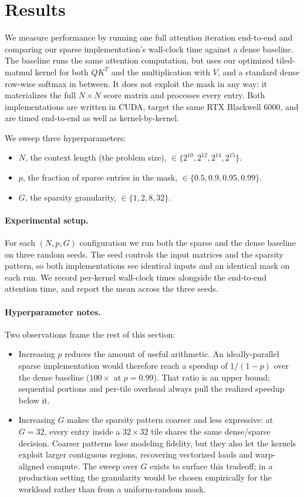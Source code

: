 \documentclass[11pt]{article}
\begin{document}
\section*{Results}
We measure performance by running one full attention iteration end-to-end and comparing our sparse implementation's wall-clock time against a dense baseline. The baseline runs the same attention computation, but uses our optimized tiled-matmul kernel for both $QK^T$ and the multiplication with $V$, and a standard dense row-wise softmax in between. It does not exploit the mask in any way: it materializes the full $N \times N$ score matrix and processes every entry. Both implementations are written in CUDA, target the same RTX Blackwell 6000, and are timed end-to-end as well as kernel-by-kernel.

We sweep three hyperparameters:
\begin{itemize}
    \item $N$, the context length (the problem size), $\in \{2^{10}, 2^{12}, 2^{14}, 2^{15}\}$.
    \item $p$, the fraction of sparse entries in the mask, $\in \{0.5, 0.9, 0.95, 0.99\}$.
    \item $G$, the sparsity granularity, $\in \{1, 2, 8, 32\}$.
\end{itemize}

\paragraph{Experimental setup.}
For each $(N, p, G)$ configuration we run both the sparse and the dense baseline on three random seeds. The seed controls the input matrices and the sparsity pattern, so both implementations see identical inputs and an identical mask on each run. We record per-kernel wall-clock times alongside the end-to-end attention time, and report the mean across the three seeds.

\paragraph{Hyperparameter notes.}
Two observations frame the rest of this section:
\begin{itemize}
    \item Increasing $p$ reduces the amount of useful arithmetic. An ideally-parallel sparse implementation would therefore reach a speedup of $1/(1 - p)$ over the dense baseline ($100\times$ at $p = 0.99$). That ratio is an upper bound; sequential portions and per-tile overhead always pull the realized speedup below it.
    \item Increasing $G$ makes the sparsity pattern coarser and less expressive: at $G = 32$, every entry inside a $32 \times 32$ tile shares the same dense/sparse decision. Coarser patterns lose modeling fidelity, but they also let the kernels exploit larger contiguous regions, recovering vectorized loads and warp-aligned compute. The sweep over $G$ exists to surface this tradeoff; in a production setting the granularity would be chosen empirically for the workload rather than from a uniform-random mask.
\end{itemize}
\end{document}
